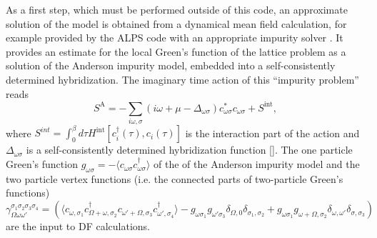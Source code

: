 \documentclass[3p,times,procedia]{elsarticle}
\begin{document}
As a first step, which must be performed outside of this code, an approximate solution of the model is obtained from a dynamical mean field calculation, for example provided by the ALPS code \cite{Albuquerque2007} with an appropriate impurity solver \cite{Hafermann2013a}.
It provides an estimate for the local Green's function of the lattice problem as a  solution of the Anderson impurity model, embedded into a self-consistently determined hybridization. The imaginary time action of this ``impurity problem''  reads  
\begin{equation}
S^{\mathrm{A}} = -\sum_{i\omega,\sigma} (i\omega + \mu - \Delta_{\omega\sigma}) c^*_{\omega\sigma} c_{\omega\sigma} + S^{\mathrm{int}},
\end{equation}
where $S^{int} = \int_0^\beta d\tau H^{\mathrm{int}} [c^\dagger_i(\tau), c_i(\tau)] $ is the interaction part of the action and $\Delta_{\omega\sigma}$ is a self-consistently determined hybridization function []. 
The one particle Green's function $g_{\omega\sigma} = -\langle c_{\omega\sigma} c^\dagger_{\omega\sigma} \rangle$ of the of the Anderson impurity model and the two particle vertex functions (i.e. the connected parts of two-particle Green's functions)  
\begin{equation}\label{eqn:vertex}
\gamma_{\Omega\omega\omega'}^{\sigma_1\sigma_2\sigma_3\sigma_4} = \left(\langle c_{\omega,\sigma_1} c^\dagger_{\Omega + \omega,\sigma_2} c_{\omega' + \Omega, \sigma_3} c^\dagger_{\omega', \sigma_4}\rangle - g_{\omega\sigma_1}g_{\omega'\sigma_3}\delta_{\Omega,0}\delta_{\sigma_1,\sigma_2} + g_{\omega\sigma_1} g_{\omega + \Omega, \sigma_2} \delta_{\omega,\omega'}\delta_{\sigma, \sigma_3} \right)
\end{equation}
are the input to DF calculations. 
\end{document}
